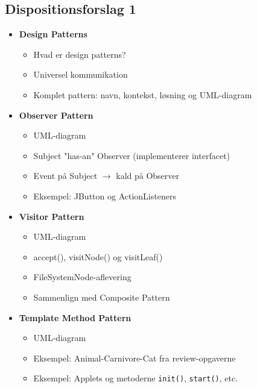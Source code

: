 \subsection{Dispositionsforslag 1}

\begin{itemize}
    \item \textbf{Design Patterns}
    \begin{itemize}
        \item Hvad er design patterns?
        \item Universel kommunikation
        \item Komplet pattern: navn, kontekst, løsning og UML-diagram
    \end{itemize}
    
    \item \textbf{Observer Pattern}
    \begin{itemize}
        \item UML-diagram
        \item Subject "has-an" Observer (implementerer interfacet)
        \item Event på Subject $\rightarrow$ kald på Observer
        \item Eksempel: JButton og ActionListeners
    \end{itemize}
    
    \item \textbf{Visitor Pattern}
    \begin{itemize}
        \item UML-diagram
        \item accept(), visitNode() og visitLeaf()
        \item FileSystemNode-aflevering
        \item Sammenlign med Composite Pattern
    \end{itemize}
    
    \item \textbf{Template Method Pattern}
    \begin{itemize}
        \item UML-diagram
        \item Eksempel: Animal-Carnivore-Cat fra review-opgaverne
        \item Eksempel: Applets og metoderne \verb|init()|, \verb|start()|, etc.
    \end{itemize}
    
\end{itemize}
